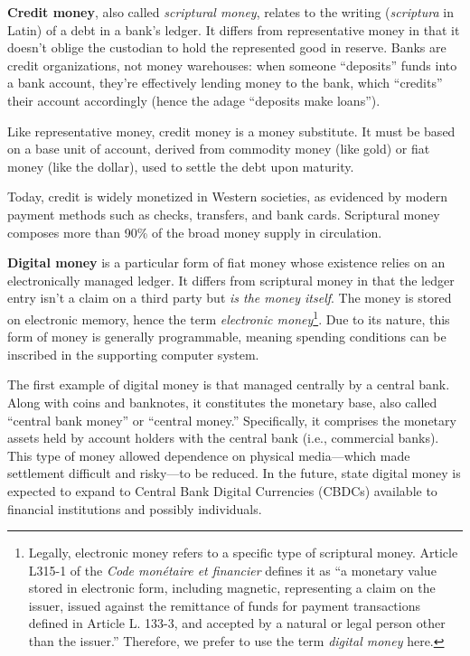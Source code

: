 \documentclass[
  a5paper,
  smalldemyvopaper,10pt,twoside,onecolumn,openright,extrafontsizes,hidelinks]{memoir}
\begin{document}
\textbf{Credit money}, also called \emph{scriptural money}, relates to
the writing (\emph{scriptura} in Latin) of a debt in a bank's ledger. It
differs from representative money in that it doesn't oblige the
custodian to hold the represented good in reserve. Banks are credit
organizations, not money warehouses: when someone ``deposits'' funds
into a bank account, they're effectively lending money to the bank,
which ``credits'' their account accordingly (hence the adage ``deposits
make loans'').

Like representative money, credit money is a money substitute. It must
be based on a base unit of account, derived from commodity money (like
gold) or fiat money (like the dollar), used to settle the debt upon
maturity.

Today, credit is widely monetized in Western societies, as evidenced by
modern payment methods such as checks, transfers, and bank cards.
Scriptural money composes more than 90\% of the broad money supply in
circulation.

\textbf{Digital money} is a particular form of fiat money whose
existence relies on an electronically managed ledger. It differs from
scriptural money in that the ledger entry isn't a claim on a third party
but \emph{is the money itself}. The money is stored on electronic
memory, hence the term \emph{electronic money}\footnote{Legally,
  electronic money refers to a specific type of scriptural money.
  Article L315-1 of the \emph{Code monétaire et financier} defines it as
  ``a monetary value stored in electronic form, including magnetic,
  representing a claim on the issuer, issued against the remittance of
  funds for payment transactions defined in Article L. 133-3, and
  accepted by a natural or legal person other than the issuer.''
  Therefore, we prefer to use the term \emph{digital money} here.}. Due
to its nature, this form of money is generally programmable, meaning
spending conditions can be inscribed in the supporting computer system.

The first example of digital money is that managed centrally by a
central bank. Along with coins and banknotes, it constitutes the
monetary base, also called ``central bank money'' or ``central money.''
Specifically, it comprises the monetary assets held by account holders
with the central bank (i.e., commercial banks). This type of money
allowed dependence on physical media---which made settlement difficult
and risky---to be reduced. In the future, state digital money is
expected to expand to Central Bank Digital Currencies (CBDCs) available
to financial institutions and possibly individuals.
\end{document}
